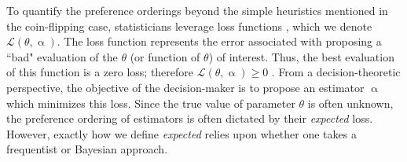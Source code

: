 \documentclass[letterpaper,12pt]{article}
\begin{document}
To quantify the preference orderings beyond the simple heuristics mentioned in the coin-flipping case, statisticians leverage loss functions  \cite{wald1950}, which we denote $\mathcal{L}(\theta, \upalpha)$. The loss function represents the error associated with proposing a ``bad" evaluation of the $\theta$ (or function of $\theta$) of interest. Thus, the best evaluation of this function is a zero loss; therefore $\mathcal{L}(\theta, \upalpha) \geq 0$ \cite{robert2007bayesian}. From a decision-theoretic perspective, the objective of the decision-maker is to propose an estimator $\upalpha$ which minimizes this loss. Since the true value of parameter $\theta$ is often unknown, the preference ordering of estimators is often dictated by their \textit{expected} loss. However, exactly how we define \textit{expected} relies upon whether one takes a {frequentist} or {Bayesian} approach. 
\end{document}

